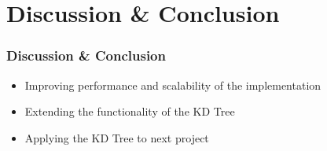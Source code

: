 \documentclass[
	12pt, %
	aspectratio=169, %
]{beamer}
\begin{document}


\section{Discussion \& Conclusion}

\begin{frame}
	\frametitle{Discussion \& Conclusion}

	\begin{itemize}
		\item Improving performance and scalability of the implementation
		\item Extending the functionality of the KD Tree
		\item Applying the KD Tree to next project
	\end{itemize}
\end{frame}



\end{document}
